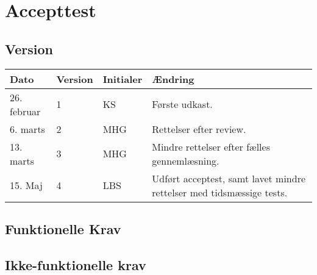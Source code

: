 \chapter{Accepttest} \label{ch:Accepttest}
\section*{Version}
\begin{table}[h]
	\centering
	\begin{tabularx}{\textwidth - 2cm}{|l|l|l|X|}
	\hline
	Dato	& Version	& Initialer & Ændring	\\ \hline
	26. februar & 1 & KS & Første udkast. \\ \hline
	6. marts & 2 & MHG & Rettelser efter review. \\ \hline
	13. marts & 3 & MHG & Mindre rettelser efter fælles gennemlæsning.\\\hline
	15. Maj & 4 & LBS & Udført acceptest, samt lavet mindre rettelser med tidsmæssige tests. \\\hline
	\end{tabularx}
\end{table}
\clearpage

\section{Funktionelle Krav}
\clearpage
{} 
\clearpage
{}
\clearpage
{} 
\clearpage
{}
\clearpage
{}
\clearpage
{}

\clearpage

\section{Ikke-funktionelle krav}

\clearpage